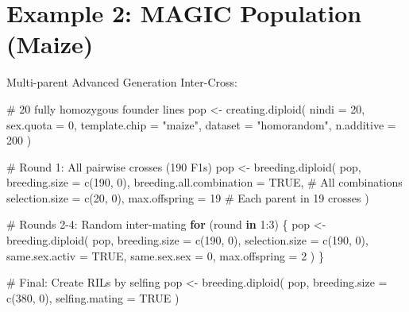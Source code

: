 \documentclass[
  letterpaper,
]{book}
\newenvironment{Shaded}{\begin{snugshade}}{\end{snugshade}}
\newcommand{\AttributeTok}[1]{\textcolor[rgb]{0.40,0.45,0.13}{#1}}
\newcommand{\CommentTok}[1]{\textcolor[rgb]{0.37,0.37,0.37}{#1}}
\newcommand{\ConstantTok}[1]{\textcolor[rgb]{0.56,0.35,0.01}{#1}}
\newcommand{\ControlFlowTok}[1]{\textcolor[rgb]{0.00,0.23,0.31}{\textbf{#1}}}
\newcommand{\DecValTok}[1]{\textcolor[rgb]{0.68,0.00,0.00}{#1}}
\newcommand{\FunctionTok}[1]{\textcolor[rgb]{0.28,0.35,0.67}{#1}}
\newcommand{\NormalTok}[1]{\textcolor[rgb]{0.00,0.23,0.31}{#1}}
\newcommand{\OtherTok}[1]{\textcolor[rgb]{0.00,0.23,0.31}{#1}}
\newcommand{\SpecialCharTok}[1]{\textcolor[rgb]{0.37,0.37,0.37}{#1}}
\newcommand{\StringTok}[1]{\textcolor[rgb]{0.13,0.47,0.30}{#1}}
\begin{document}
\section{Example 2: MAGIC Population (Maize)}\label{sec-example-magic}

Multi-parent Advanced Generation Inter-Cross:

\begin{Shaded}
\begin{Highlighting}[]
\CommentTok{\# 20 fully homozygous founder lines}
\NormalTok{pop }\OtherTok{\textless{}{-}} \FunctionTok{creating.diploid}\NormalTok{(}
  \AttributeTok{nindi =} \DecValTok{20}\NormalTok{,}
  \AttributeTok{sex.quota =} \DecValTok{0}\NormalTok{,}
  \AttributeTok{template.chip =} \StringTok{"maize"}\NormalTok{,}
  \AttributeTok{dataset =} \StringTok{"homorandom"}\NormalTok{,}
  \AttributeTok{n.additive =} \DecValTok{200}
\NormalTok{)}

\CommentTok{\# Round 1: All pairwise crosses (190 F1s)}
\NormalTok{pop }\OtherTok{\textless{}{-}} \FunctionTok{breeding.diploid}\NormalTok{(}
\NormalTok{  pop,}
  \AttributeTok{breeding.size =} \FunctionTok{c}\NormalTok{(}\DecValTok{190}\NormalTok{, }\DecValTok{0}\NormalTok{),}
  \AttributeTok{breeding.all.combination =} \ConstantTok{TRUE}\NormalTok{,  }\CommentTok{\# All combinations}
  \AttributeTok{selection.size =} \FunctionTok{c}\NormalTok{(}\DecValTok{20}\NormalTok{, }\DecValTok{0}\NormalTok{),}
  \AttributeTok{max.offspring =} \DecValTok{19}                \CommentTok{\# Each parent in 19 crosses}
\NormalTok{)}

\CommentTok{\# Rounds 2{-}4: Random inter{-}mating}
\ControlFlowTok{for}\NormalTok{ (round }\ControlFlowTok{in} \DecValTok{1}\SpecialCharTok{:}\DecValTok{3}\NormalTok{) \{}
\NormalTok{  pop }\OtherTok{\textless{}{-}} \FunctionTok{breeding.diploid}\NormalTok{(}
\NormalTok{    pop,}
    \AttributeTok{breeding.size =} \FunctionTok{c}\NormalTok{(}\DecValTok{190}\NormalTok{, }\DecValTok{0}\NormalTok{),}
    \AttributeTok{selection.size =} \FunctionTok{c}\NormalTok{(}\DecValTok{190}\NormalTok{, }\DecValTok{0}\NormalTok{),}
    \AttributeTok{same.sex.activ =} \ConstantTok{TRUE}\NormalTok{,}
    \AttributeTok{same.sex.sex =} \DecValTok{0}\NormalTok{,}
    \AttributeTok{max.offspring =} \DecValTok{2}
\NormalTok{  )}
\NormalTok{\}}

\CommentTok{\# Final: Create RILs by selfing}
\NormalTok{pop }\OtherTok{\textless{}{-}} \FunctionTok{breeding.diploid}\NormalTok{(}
\NormalTok{  pop,}
  \AttributeTok{breeding.size =} \FunctionTok{c}\NormalTok{(}\DecValTok{380}\NormalTok{, }\DecValTok{0}\NormalTok{),}
  \AttributeTok{selfing.mating =} \ConstantTok{TRUE}
\NormalTok{)}
\end{Highlighting}
\end{Shaded}
\end{document}

